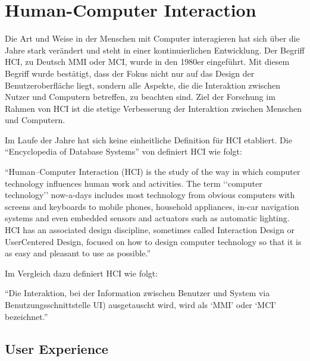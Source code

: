 \section{Human-Computer Interaction}\label{sec:ux}

Die Art und Weise in der Menschen mit Computer interagieren hat sich über die Jahre stark verändert und steht in einer kontinuierlichen Entwicklung. 
Der Begriff  \ac{HCI}, zu Deutsch \ac{MMI} oder \ac{MCI}, wurde in den 1980er eingeführt.
Mit diesem Begriff wurde bestätigt, dass der Fokus nicht nur auf das Design der Benutzeroberfläche liegt, sondern alle Aspekte, die die Interaktion zwischen Nutzer und Computern betreffen, zu beachten sind. \citep[vgl.]{preece_human-computer_1995}
Ziel der Forschung im Rahmen von \ac{HCI} ist die stetige Verbesserung der Interaktion zwischen Menschen und Computern. \newline

\noindent Im Laufe der Jahre hat sich keine einheitliche Definition für \ac{HCI} etabliert.
Die \enquote{Encyclopedia of Database Systems} von \citet{dix_human-computer_2009} definiert \ac{HCI} wie folgt:
\begin{definition}
  \enquote{Human–Computer Interaction (HCI) is the study of the way in which computer technology influences human work and activities. 
  The term ‘‘computer technology’’ now-a-days includes most technology from obvious computers with screens and keyboards to mobile phones, household appliances, in-car navigation
  systems and even embedded sensors and actuators such as automatic lighting. 
  HCI has an associated design discipline, sometimes called Interaction Design or UserCentered Design, focused on how to design computer technology so that it is as easy and
  pleasant to use as possible.}
\end{definition}

\noindent Im Vergleich dazu definiert \citet{heimgartner_interkulturelles_2017}  \ac{HCI}  wie folgt:

\begin{definition}
  \enquote{Die Interaktion, bei der Information zwischen Benutzer und System via Benutzungsschnittstelle \ac{UI}) ausgetauscht wird, wird als \enquote{\ac{MMI}}  oder  \enquote{\ac{MCI}} bezeichnet.}
\end{definition}

\subsection{User Experience}

